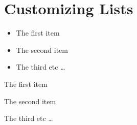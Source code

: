 \documentclass[english]{article}
\begin{document}
\section{Customizing Lists}

\renewcommand{\labelitemi}{\ding{43}}


\begin{itemize}
  \item The first item
  \item The second item
  \item The third etc \ldots
\end{itemize}

\begin{dinglist}{51}
  \item The first item
  \item The second item
  \item The third etc \ldots
\end{dinglist}
\end{document}

